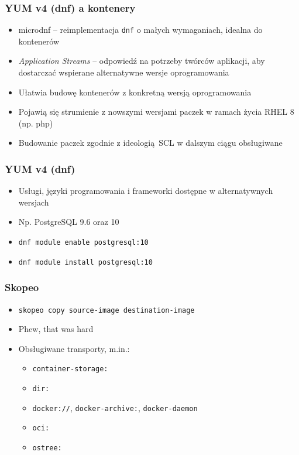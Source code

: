 \documentclass[dvipsnames,table]{beamer}
\begin{document}
\begin{frame}
\frametitle{YUM v4 (dnf) a kontenery}
\begin{itemize}
	\item microdnf -- reimplementacja {\tt dnf} o małych wymaganiach, idealna do kontenerów
	\item {\em Application Streams} -- odpowiedź na potrzeby twórców aplikacji, aby dostarczać wspierane alternatywne wersje oprogramowania
	\item Ułatwia budowę kontenerów z konkretną wersją oprogramowania
	\item Pojawią się strumienie z nowszymi wersjami paczek w ramach życia RHEL 8 (np. php)
	\item Budowanie paczek zgodnie z ideologią SCL w dalszym ciągu obsługiwane
\end{itemize}
\begin{center}
\end{center}
\end{frame}

\begin{frame}
\frametitle{YUM v4 (dnf)}
\begin{itemize}
	\item Usługi, języki programowania i frameworki dostępne w alternatywnych wersjach
	\item Np. PostgreSQL 9.6 oraz 10
	\item {\tt dnf module enable postgresql:10}
	\item {\tt dnf module install postgresql:10}
\end{itemize}
\end{frame}

\begin{frame}
	\frametitle{Skopeo}
	\begin{itemize}
		\item {\tt skopeo copy source-image destination-image}
		\item Phew, that was hard
		\item Obsługiwane transporty, m.in.:
		\begin{itemize}
			\item {\tt container-storage:}
			\item {\tt dir:}
			\item {\tt docker://}, {\tt docker-archive:}, {\tt docker-daemon}
			\item {\tt oci:}
			\item {\tt ostree:}
		\end{itemize}
	\end{itemize}
\end{frame}
\end{document}

